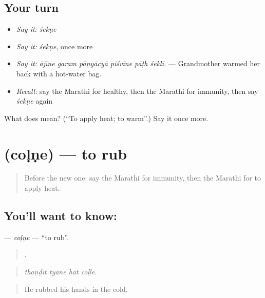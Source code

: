 \subsection*{Your turn}
\begin{itemize}
\raggedright
  \item \emph{Say it:} \emph{śekṇe}
  \item \emph{Say it:} \emph{śekṇe}, once more
  \item \emph{Say it:} \emph{ājīne garam pāṇyācyā piśvīne pāṭh śeklī.} — Grandmother warmed her back with a hot-water bag.
  \item \emph{Recall:} say the Marathi for healthy, then the Marathi for immunity, then say \emph{śekṇe} again
\end{itemize}

\begin{tcolorbox}[breakable,colback=teal!4,colframe=teal!35!black,title={Before you move on}]
What does  mean? (\textquotedblleft{}To apply heat; to warm\textquotedblright{}.) Say it once more.
\end{tcolorbox}
\section[\texorpdfstring{\mr{चोळणे} (coḷṇe)}{चोळणे (coḷṇe)}]{ (coḷṇe) — to rub}

\label{lesson:MR-C490-colne}



\begin{quote}
Before the new one: say the Marathi for immunity, then the Marathi for to apply heat.
\end{quote}

\subsection*{You'll want to know: }
\textbf{} — \emph{coḷṇe} — \textquotedblleft{}to rub\textquotedblright{}.

\begin{quote}
   .
\end{quote}

\begin{quote}
\emph{thaṇḍīt tyāne hāt coḷle.}
\end{quote}

\begin{quote}
He rubbed his hands in the cold.
\end{quote}

